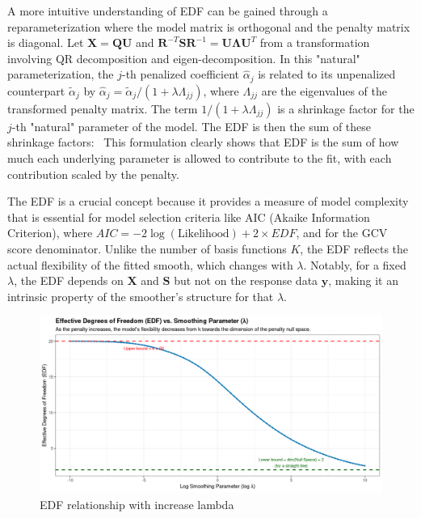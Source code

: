 \documentclass[11pt, a4paper]{article}
\begin{document}
\begin{itemize}
A more intuitive understanding of EDF can be gained through a reparameterization where the model matrix is orthogonal and the penalty matrix is diagonal. Let $\mathbf{X} = \mathbf{Q}\mathbf{U}$ and $\mathbf{R}^{-T}\mathbf{S}\mathbf{R}^{-1} = \mathbf{U\Lambda U}^T$ from a transformation involving QR decomposition and eigen-decomposition. In this "natural" parameterization, the $j$-th penalized coefficient $\hat{\alpha}_j$ is related to its unpenalized counterpart $\tilde{\alpha}_j$ by $\hat{\alpha}_j = \tilde{\alpha}_j / (1 + \lambda \Lambda_{jj})$, where $\Lambda_{jj}$ are the eigenvalues of the transformed penalty matrix. The term $1 / (1 + \lambda \Lambda_{jj})$ is a shrinkage factor for the $j$-th "natural" parameter of the model. The EDF is then the sum of these shrinkage factors:
\
This formulation clearly shows that EDF is the sum of how much each underlying parameter is allowed to contribute to the fit, with each contribution scaled by the penalty.

The EDF is a crucial concept because it provides a measure of model complexity that is essential for model selection criteria like AIC (Akaike Information Criterion), where $AIC = -2 \log(\text{Likelihood}) + 2 \times EDF$, and for the GCV score denominator. Unlike the number of basis functions $K$, the EDF reflects the actual flexibility of the fitted smooth, which changes with $\lambda$. Notably, for a fixed $\lambda$, the EDF depends on $\mathbf{X}$ and $\mathbf{S}$ but not on the response data $\mathbf{y}$, making it an intrinsic property of the smoother's structure for that $\lambda$.

\begin{figure}
 \centering
 \includegraphics[width=1\linewidth]{edg_viz.png}
 \caption{EDF relationship with increase lambda}
 \label{fig:enter-label}
\end{figure}


\end{itemize}
\end{document}
